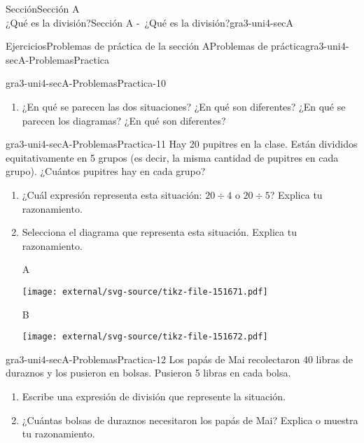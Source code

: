 \begin{sectionptx}{Sección}{{\Large Sección A\\}¿Qué es la división?}{}{Sección A -~¿Qué es la división?}{}{}{gra3-uni4-secA}
\begin{exercises-subsection}{Ejercicios}{Problemas de práctica de la sección A}{}{Problemas de práctica}{}{}{gra3-uni4-secA-ProblemasPractica}
\begin{divisionexercise}{8}{}{}{gra3-uni4-secA-ProblemasPractica-10}
\begin{enumerate}[label={(\alph*)}]
\item{}¿En qué se parecen las dos situaciones? ¿En qué son diferentes? ¿En qué se parecen los diagramas? ¿En qué son diferentes?%
\end{enumerate}
%
\end{divisionexercise}%
\clearpage
\begin{divisionexercise}{9}{}{}{gra3-uni4-secA-ProblemasPractica-11}%
Hay 20 pupitres en la clase. Están divididos equitativamente en 5 grupos (es decir, la misma cantidad de pupitres en cada grupo). ¿Cuántos pupitres hay en cada grupo?%
\par
%
\begin{enumerate}[label={(\alph*)}]
\item{}¿Cuál expresión representa esta situación: \(20\div 4\) o \(20\div 5\)? Explica tu razonamiento.%
\item{}Selecciona el diagrama que representa esta situación. Explica tu razonamiento.%
\begin{sidebyside}{2}{0}{0}{0}%
\begin{sbspanel}{0.07}%
A%
\end{sbspanel}%
\begin{sbspanel}{0.93}%
\texttt{[image: external/svg-source/tikz-file-151671.pdf]}
\end{sbspanel}%
\end{sidebyside}%
\begin{sidebyside}{2}{0}{0}{0}%
\begin{sbspanel}{0.07}%
B%
\end{sbspanel}%
\begin{sbspanel}{0.93}%
\texttt{[image: external/svg-source/tikz-file-151672.pdf]}
\end{sbspanel}%
\end{sidebyside}%
\end{enumerate}
%
\end{divisionexercise}%
\begin{divisionexercise}{10}{}{}{gra3-uni4-secA-ProblemasPractica-12}%
Los papás de Mai recolectaron 40 libras de duraznos y los pusieron en bolsas. Pusieron 5 libras en cada bolsa.%
\par
%
\begin{enumerate}[label={(\alph*)}]
\item{}Escribe una expresión de división que represente la situación.%
\item{}¿Cuántas bolsas de duraznos necesitaron los papás de Mai? Explica o muestra tu razonamiento.%

\end{enumerate}
\end{divisionexercise}
\end{exercises-subsection}
\end{sectionptx}
